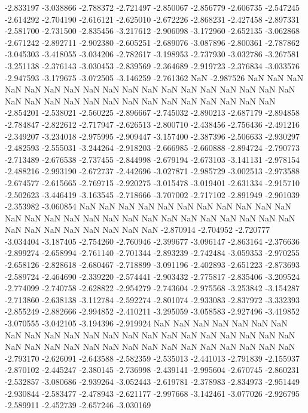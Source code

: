 -2.833197
-3.038866
-2.788372
-2.721497
-2.850067
-2.856779
-2.606735
-2.547245
-2.614292
-2.704190
-2.616121
-2.625010
-2.672226
-2.868231
-2.427458
-2.897331
-2.581700
-2.731500
-2.835456
-3.217612
-2.906098
-3.172960
-2.652135
-3.062868
-2.671242
-2.892711
-2.902380
-2.605251
-2.689076
-3.087896
-2.800361
-2.787862
-3.045303
-3.418055
-3.034206
-2.782617
-3.198953
-2.737930
-3.032786
-3.267581
-3.251138
-2.376143
-3.030453
-2.839569
-2.364689
-2.919723
-2.376834
-3.033576
-2.947593
-3.179675
-3.072505
-3.146259
-2.761362
NaN
-2.987526
NaN
NaN
NaN
NaN
NaN
NaN
NaN
NaN
NaN
NaN
NaN
NaN
NaN
NaN
NaN
NaN
NaN
NaN
NaN
NaN
NaN
NaN
NaN
NaN
NaN
NaN
NaN
NaN
NaN
NaN
NaN
NaN
-2.854201
-2.538021
-2.560225
-2.896667
-2.745032
-2.890213
-2.687179
-2.894858
-2.784847
-2.822612
-2.717947
-2.626513
-2.800710
-2.438456
-2.756436
-2.491216
-2.349207
-3.234018
-2.975995
-2.909447
-3.157400
-2.387396
-2.506633
-2.930297
-2.482593
-2.555031
-3.244264
-2.918203
-2.666985
-2.660888
-2.894724
-2.790773
-2.713489
-2.676538
-2.737455
-2.844998
-2.679194
-2.673103
-3.141131
-2.978154
-2.488216
-2.993190
-2.672737
-2.442696
-3.027871
-2.985729
-3.002513
-2.973588
-2.674577
-2.615665
-2.769715
-2.920275
-3.015478
-3.019401
-2.631334
-2.915710
-2.502623
-3.446419
-3.163545
-2.718666
-3.707002
-2.717102
-2.891949
-2.901039
-2.353982
-3.060854
NaN
NaN
NaN
NaN
NaN
NaN
NaN
NaN
NaN
NaN
NaN
NaN
NaN
NaN
NaN
NaN
NaN
NaN
NaN
NaN
NaN
NaN
NaN
NaN
NaN
NaN
NaN
NaN
NaN
NaN
NaN
NaN
NaN
NaN
-2.870914
-2.704952
-2.720777
-3.034404
-3.187405
-2.754260
-2.760946
-2.399677
-3.096147
-2.863164
-2.376636
-2.899274
-2.658994
-2.761140
-2.701344
-2.893239
-2.742484
-3.059353
-2.970255
-2.658126
-2.828618
-2.680467
-2.718899
-3.091196
-2.402893
-2.651223
-2.873693
-2.589724
-2.464690
-2.339220
-2.574441
-2.903432
-2.775817
-2.835406
-3.209524
-2.774099
-2.740758
-2.628822
-2.954279
-2.743604
-2.975568
-3.253842
-3.154287
-2.713860
-2.638138
-3.112784
-2.592274
-2.801074
-2.933083
-2.837972
-3.332393
-2.855249
-2.882666
-2.994852
-2.410211
-3.295059
-3.058583
-2.927496
-3.419852
-3.070555
-3.042105
-3.194396
-2.919924
NaN
NaN
NaN
NaN
NaN
NaN
NaN
NaN
NaN
NaN
NaN
NaN
NaN
NaN
NaN
NaN
NaN
NaN
NaN
NaN
NaN
NaN
NaN
NaN
NaN
NaN
NaN
NaN
NaN
NaN
NaN
NaN
NaN
NaN
NaN
NaN
NaN
-2.793170
-2.626091
-2.643588
-2.582359
-2.535013
-2.441013
-2.791839
-2.155937
-2.870102
-2.445247
-2.380145
-2.736998
-2.439141
-2.995604
-2.670745
-2.860231
-2.532857
-3.080686
-2.939264
-3.052443
-2.619781
-2.378983
-2.834973
-2.951449
-2.930844
-2.583477
-2.478943
-2.621177
-2.997668
-3.142461
-3.077026
-2.926795
-2.589911
-2.452739
-2.657246
-3.030169

